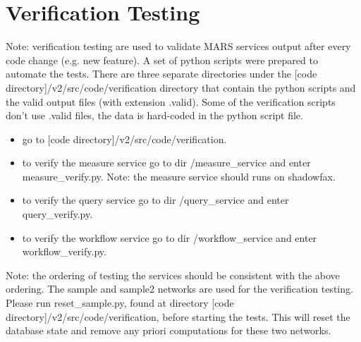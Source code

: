 \section{Verification Testing}
Note: verification testing are used to validate MARS services output after every code change (e.g. new feature). A set of python scripts were prepared to automate the tests. There are three separate directories under the [code directory]/v2/src/code/verification directory that contain the python scripts and the valid output files (with extension .valid). Some of the verification scripts don't use .valid files, the data is hard-coded in the python script file.

\begin{itemize}
\item go to [code directory]/v2/src/code/verification. 
\item to verify the measure service go to dir /measure\_service and enter measure\_verify.py. Note: the measure service should runs on shadowfax. 
\item to verify the query service go to dir /query\_service and enter query\_verify.py. 
\item to verify the workflow service go to dir /workflow\_service and enter workflow\_verify.py.


\end{itemize}
Note: the ordering of testing the services should be consistent with the above ordering. The sample and sample2 networks are used for the verification testing. Please run reset\_sample.py, found at directory [code directory]/v2/src/code/verification, before starting the tests. This will reset the database state and remove any priori computations for these two networks.
